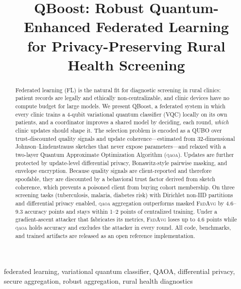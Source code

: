 \documentclass[conference]{IEEEtran}
\newcommand{\qaoa}{\textsc{qaoa}}
\newcommand{\fedavg}{\textsc{FedAvg}}
\begin{document}
\title{QBoost: Robust Quantum-Enhanced Federated Learning\\ for Privacy-Preserving Rural Health Screening}

\author{
}

\maketitle

\begin{abstract}
Federated learning (FL) is the natural fit for diagnostic screening in rural
clinics: patient records are legally and ethically non-centralizable, and
clinic devices have no compute budget for large models. We present QBoost, a
federated system in which every clinic trains a 4-qubit variational quantum
classifier (VQC) locally on its own patients, and a coordinator improves a
shared model by deciding, each round, \emph{which} clinic updates should shape
it. The selection problem is encoded as a QUBO over trust-discounted quality
signals and update coherence---estimated from 32-dimensional
Johnson--Lindenstrauss sketches that never expose parameters---and relaxed
with a two-layer Quantum Approximate Optimization Algorithm (\qaoa{}).
Updates are further protected by update-level differential privacy,
Bonawitz-style pairwise masking, and envelope encryption. Because quality
signals are client-reported and therefore spoofable, they are discounted by a
behavioral trust factor derived from sketch coherence, which prevents a
poisoned client from buying cohort membership. On three screening tasks
(tuberculosis, malaria, diabetes risk) with Dirichlet non-IID partitions and
differential privacy enabled, \qaoa{} aggregation outperforms masked \fedavg{}
by 4.6--9.3 accuracy points and stays within 1--2 points of centralized
training. Under a gradient-ascent attacker that fabricates its metrics,
\fedavg{} loses up to 4.6 points while \qaoa{} holds accuracy and excludes the
attacker in every round. All code, benchmarks, and trained artifacts are
released as an open reference implementation.
\end{abstract}

\begin{IEEEkeywords}
federated learning, variational quantum classifier, QAOA, differential privacy,
secure aggregation, robust aggregation, rural health diagnostics
\end{IEEEkeywords}
\end{document}
